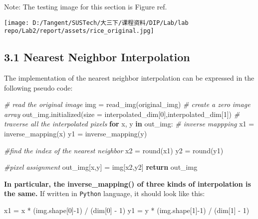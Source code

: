 \documentclass[
]{article}
\newenvironment{Shaded}{}{}
\newcommand{\BuiltInTok}[1]{\textcolor[rgb]{0.00,0.50,0.00}{#1}}
\newcommand{\CommentTok}[1]{\textcolor[rgb]{0.38,0.63,0.69}{\textit{#1}}}
\newcommand{\ControlFlowTok}[1]{\textcolor[rgb]{0.00,0.44,0.13}{\textbf{#1}}}
\newcommand{\DecValTok}[1]{\textcolor[rgb]{0.25,0.63,0.44}{#1}}
\newcommand{\KeywordTok}[1]{\textcolor[rgb]{0.00,0.44,0.13}{\textbf{#1}}}
\newcommand{\NormalTok}[1]{#1}
\newcommand{\OperatorTok}[1]{\textcolor[rgb]{0.40,0.40,0.40}{#1}}
\begin{document}
Note: The testing image for this section is Figure ref.

\texttt{[image: D:/Tangent/SUSTech/大三下/课程资料/DIP/Lab/lab repo/Lab2/report/assets/rice\_original.jpg]}

\hypertarget{31-nearest-neighbor-interpolation}{%
\subsection{3.1 Nearest Neighbor
Interpolation}\label{31-nearest-neighbor-interpolation}}

The implementation of the nearest neighbor interpolation can be
expressed in the following pseudo code:

\begin{Shaded}
\begin{Highlighting}[]
\CommentTok{\# read the original image}
\NormalTok{img }\OperatorTok{=}\NormalTok{ read\_img(original\_img)}
\CommentTok{\# create a zero image array}
\NormalTok{out\_img.initialized(size }\OperatorTok{=}\NormalTok{ interpolated\_dim[}\DecValTok{0}\NormalTok{],interpolated\_dim[}\DecValTok{1}\NormalTok{])}
\CommentTok{\# traverse all the interpolated pixels}
\ControlFlowTok{for}\NormalTok{ x, y }\KeywordTok{in}\NormalTok{ out\_img:}
	\CommentTok{\# inverse mappping}
\NormalTok{	x1 }\OperatorTok{=}\NormalTok{ inverse\_mapping(x)}
\NormalTok{	y1 }\OperatorTok{=}\NormalTok{ inverse\_mapping(y)}

	\CommentTok{\#find the index of the nearest neighbor}
\NormalTok{	x2 }\OperatorTok{=} \BuiltInTok{round}\NormalTok{(x1)}
\NormalTok{	y2 }\OperatorTok{=} \BuiltInTok{round}\NormalTok{(y1)}
	
	\CommentTok{\#pixel assignment}
\NormalTok{	out\_img[x,y] }\OperatorTok{=}\NormalTok{ img[x2,y2]}
\ControlFlowTok{return}\NormalTok{ out\_img}
	
\end{Highlighting}
\end{Shaded}

\textbf{In particular, the inverse\_mapping() of three kinds of
interpolation is the same.} If written in \texttt{Python} language, it
should look like this:

\begin{Shaded}
\begin{Highlighting}[]
\NormalTok{x1 }\OperatorTok{=}\NormalTok{ x }\OperatorTok{*}\NormalTok{ (img.shape[}\DecValTok{0}\NormalTok{]}\OperatorTok{{-}}\DecValTok{1}\NormalTok{) }\OperatorTok{/}\NormalTok{ (dim[}\DecValTok{0}\NormalTok{] }\OperatorTok{{-}} \DecValTok{1}\NormalTok{)}
\NormalTok{y1 }\OperatorTok{=}\NormalTok{ y }\OperatorTok{*}\NormalTok{ (img.shape[}\DecValTok{1}\NormalTok{]}\OperatorTok{{-}}\DecValTok{1}\NormalTok{) }\OperatorTok{/}\NormalTok{ (dim[}\DecValTok{1}\NormalTok{] }\OperatorTok{{-}} \DecValTok{1}\NormalTok{)}
\end{Highlighting}
\end{Shaded}
\end{document}
